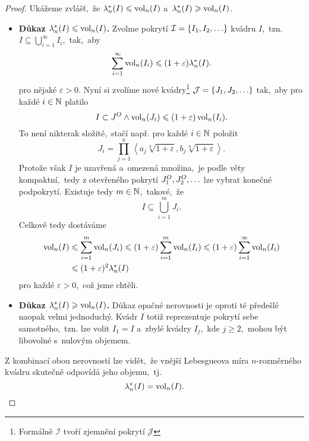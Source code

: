 \begin{proof}
    Ukážeme zvlášť,~že $\lambda_n^*(I)\leqslant\operatorname{vol}_n(I)$ a~$\lambda_n^*(I)\geqslant\operatorname{vol}_n(I)$.
    \begin{itemize}
        \item \textbf{Důkaz $\lambda_n^*(I)\leqslant\operatorname{vol}_n(I)$.} Zvolme pokrytí $\mathcal{I}=\left\{I_1,I_2,\ldots\right\}$ kvádru $I$,~tzn. $I\subseteq\bigcup_{i=1}^\infty I_i$,~tak,~aby
        \[\sum_{i=1}^{\infty}\operatorname{vol}_n(I_i)\leqslant(1+\varepsilon)\lambda_n^*(I).\]
        pro nějaké $\varepsilon>0$. Nyní si zvolíme nové kvádry\footnote{Formálně $\mathcal{I}$ tvoří zjemnění pokrytí $\mathcal{J}$} $\mathcal{J}=\left\{J_1,J_2,\ldots\right\}$ tak,~aby pro každé $i\in\mathbb{N}$ platilo
        \[I\subset J^O\land\operatorname{vol}_n(J_i)\leqslant(1+\varepsilon)\operatorname{vol}_n(I_i).\]
        To není nikterak složité,~stačí např. pro každé $i\in\mathbb{N}$ položit
        \[J_i=\prod_{j=1}^{n}\left\langle a_j\sqrt[n]{1+\varepsilon},b_j\sqrt[n]{1+\varepsilon}\right\rangle.\]
        Protože však $I$ je uzavřená a~omezená množina,~je podle věty  kompaktní,~tedy z otevřeného pokrytí $J_1^O,J_2^O,\ldots$ lze vybrat konečné podpokrytí. Existuje tedy $m\in\mathbb{N}$,~takové,~že
        \[I\subseteq\bigcup_{i=1}^m J_i.\]
        Celkově tedy dostáváme
        \begin{align*}
            \operatorname{vol}_n(I)&\leqslant\sum_{i=1}^{m}\operatorname{vol}_n(J_i)\leqslant(1+\varepsilon)\sum_{i=1}^{m}\operatorname{vol}_n(I_i)\leqslant(1+\varepsilon)\sum_{i=1}^{\infty}\operatorname{vol}_n(I_i)\\
            &\leqslant (1+\varepsilon)^2\lambda_n^*(I)
        \end{align*}
        pro každé $\varepsilon>0$,~což jsme chtěli.
        \item \textbf{Důkaz $\lambda_n^*(I)\geqslant\operatorname{vol}_n(I)$.} Důkaz opačné nerovnosti je oproti té předešlé naopak velmi jednoduchý. Kvádr $I$ totiž reprezentuje pokrytí sebe samotného,~tzn. lze volit $I_1=I$ a~zbylé kvádry $I_j$,~kde $j\geqslant 2$,~mohou být libovolné s~nulovým objemem.
    \end{itemize}
    Z kombinací obou nerovností lze vidět,~že vnější Lebesgueova míra $n$-rozměrného kvádru skutečně odpovídá jeho objemu,~tj.
    \[\lambda_n^*(I)=\operatorname{vol}_n(I).\]
\end{proof}
